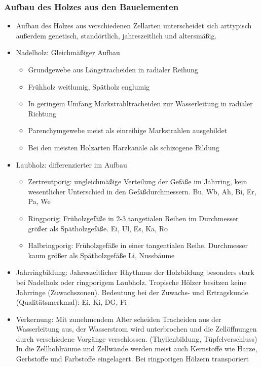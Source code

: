 \documentclass[12pt]{article}
\begin{document}
\subsubsection{Aufbau des Holzes aus den Bauelementen}
\begin{itemize}
  \item Aufbau des Holzes aus verschiedenen Zellarten unterscheidet sich
  arttypisch außerdem genetisch, standörtlich, jahreszeitlich und altersmäßig.
  \item Nadelholz: Gleichmäßiger Aufbau
  \begin{itemize}
    \item Grundgewebe aus Längstracheiden in radialer Reihung
    \item Frühholz weitlumig, Spätholz englumig
    \item In geringem Umfang Markstrahltracheiden zur Wasserleitung in radialer Richtung
    \item Parenchymgewebe meist als einreihige Markstrahlen ausgebildet
    \item Bei den meisten Holzarten Harzkanäle als schizogene Bildung
  \end{itemize}
  \item Laubholz: differenzierter im Aufbau
  \begin{itemize}
    \item Zertreutporig: ungleichmäßige Verteilung der Gefäße im Jahrring,
    kein wesentlicher Unterschied in den Gefäßdurchmessern. Bu, Wb, Ah, Bi, Er, Pa, We
    \item Ringporig: Früholzgefäße in 2-3 tangetialen Reihen im Durchmesser
    größer als Spätholzgefäße. Ei, Ul, Es, Ka, Ro
    \item Halbringporig: Früholzgefäße in einer tangentialen Reihe,
    Durchmesser kaum größer als Spätholzgefäße Li, Nussbäume
  \end{itemize}
  \item Jahrringbildung: Jahreszeitlicher Rhythmus der Holzbildung besonders
  stark bei Nadelholz oder ringporigem Laubholz. Tropische Hölzer besitzen
  keine Jahrringe (Zuwachszonen). Bedeutung bei der Zuwachs- und Ertragskunde
  (Qualitätsmerkmal): Ei, Ki, DG, Fi
  \item Verkernung: Mit zunehmendem Alter scheiden Tracheiden  aus der
  Wasserleitung aus, der Wasserstrom wird unterbrochen und die Zellöffnungen
  durch verschiedene Vorgänge verschlossen. (Thyllenbildung, Tüpfelverschluss)
  In die Zellhohlräume und Zellwände werden meist auch Kernstoffe wie Harze,
  Gerbstoffe und Farbstoffe eingelagert. Bei ringporigen Hölzern transporiert

\end{itemize}
\end{document}
